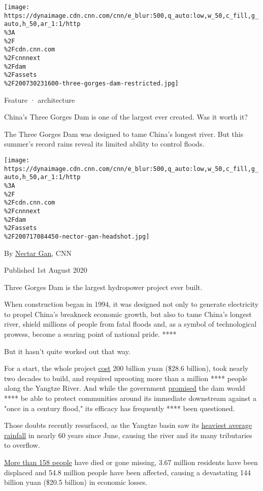 \href{/}{}\href{/style}{}

\texttt{[image: https://dynaimage.cdn.cnn.com/cnn/e\_blur:500,q\_auto:low,w\_50,c\_fill,g\_auto,h\_50,ar\_1:1/http\\\%3A\\\%2F\\\%2Fcdn.cnn.com\\\%2Fcnnnext\\\%2Fdam\\\%2Fassets\\\%2F200730231600-three-gorges-dam-restricted.jpg]}

Feature · architecture

China's Three Gorges Dam is one of the largest ever created. Was it
worth it?

The Three Gorges Dam was designed to tame China's longest river. But
this summer's record rains reveal its limited ability to control floods.

\texttt{[image: https://dynaimage.cdn.cnn.com/cnn/e\_blur:500,q\_auto:low,w\_50,c\_fill,g\_auto,h\_50,ar\_1:1/http\\\%3A\\\%2F\\\%2Fcdn.cnn.com\\\%2Fcnnnext\\\%2Fdam\\\%2Fassets\\\%2F200717084450-nector-gan-headshot.jpg]}

By \href{/profiles/nectar-gan}{Nectar Gan}, CNN

Published 1st August 2020

Three Gorges Dam is the largest hydropower project ever built.

When construction began in 1994, it was designed not only to generate
electricity to propel China's breakneck economic growth, but also to
tame China's longest river, shield millions of people from fatal floods
and, as a symbol of technological prowess, become a searing point of
national pride. ****

But it hasn't quite worked out that way.

For a start, the whole project
\href{http://politics.people.com.cn/n/2013/0607/c1001-21776413.html}{cost}
200 billion yuan (\$28.6 billion), took nearly two decades to build, and
required uprooting more than a million **** people along the Yangtze
River. And while the government
\href{http://www.npc.gov.cn/wxzl/gongbao/2000-12/14/content_5002697.htm}{promised}
the dam would **** be able to protect communities around its immediate
downstream against a "once in a century flood," its efficacy has
frequently **** been questioned.

Those doubts recently resurfaced, as the Yangtze basin saw its
\href{http://www.xinhuanet.com/english/2020-07/14/c_139209909.htm}{heaviest
average rainfall} in nearly 60 years since June, causing the river and
its many tributaries to overflow.

\href{https://www.mem.gov.cn/xw/bndt/202007/t20200728_354105.html}{More
than 158 people} have died or gone missing, 3.67 million residents have
been displaced and 54.8 million people have been affected, causing a
devastating 144 billion yuan (\$20.5 billion) in economic losses.

